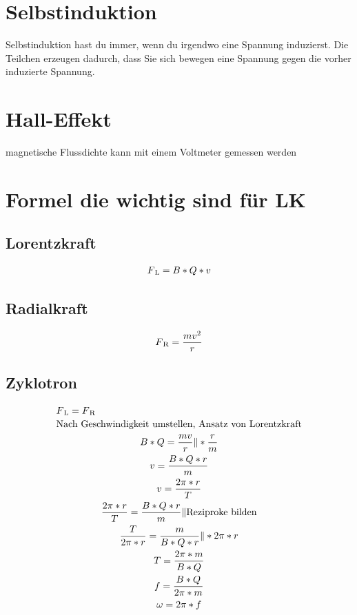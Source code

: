\documentclass{scrartcl}
\begin{document}
    \section*{Selbstinduktion}
        Selbstinduktion hast du immer, wenn du irgendwo eine Spannung induzierst. Die Teilchen erzeugen dadurch, dass Sie sich bewegen eine Spannung gegen die vorher induzierte Spannung.
    \section*{Hall-Effekt}
        magnetische Flussdichte kann mit einem Voltmeter gemessen werden
    \section*{Formel die wichtig sind für LK}
        \subsection*{Lorentzkraft}
            \begin{equation}
                \begin{multlined}
                    F\textsubscript{L}=B*Q*v
                \end{multlined}
            \end{equation}
        \subsection*{Radialkraft}
            \begin{equation}
                \begin{multlined}
                    F\textsubscript{R}=\frac{mv^2}{r}
                \end{multlined}
            \end{equation}
        \subsection*{Zyklotron}
            \begin{equation}
                \begin{multlined}
                    F\textsubscript{L}=F\textsubscript{R} \\
                    \text{Nach Geschwindigkeit umstellen, Ansatz von Lorentzkraft} \\
                    B*Q = \frac{mv}{r} \| * \frac{r}{m} \\
                    v=\frac{B*Q*r}{m} \\
                    v=\frac{2\pi*r}{T} \\
                    \frac{2\pi*r}{T}=\frac{B*Q*r}{m} \| \text{Reziproke bilden} \\
                    \frac{T}{2\pi*r}=\frac{m}{B*Q*r} \| *2\pi*r \\
                    T=\frac{2\pi*m}{B*Q} \\
                    f=\frac{B*Q}{2\pi*m} \\
                    \omega=2\pi*f \\
                \end{multlined}
            \end{equation}
\end{document}
